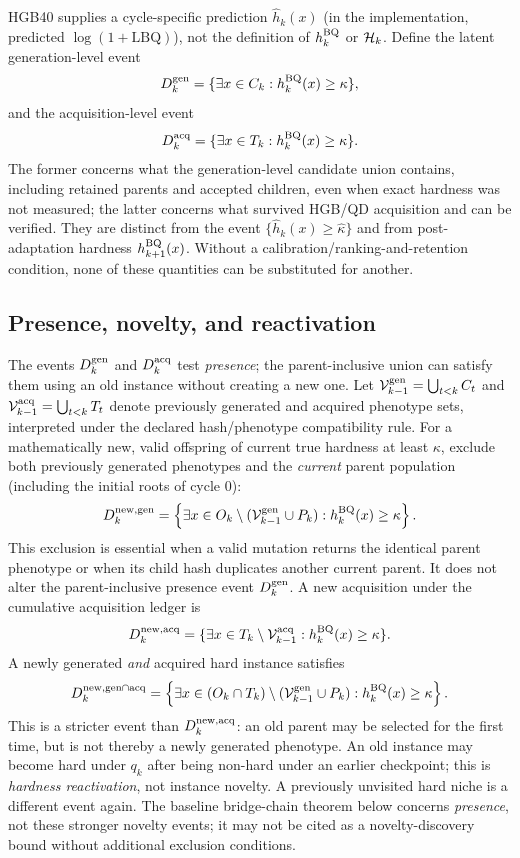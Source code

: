 HGB40 supplies a cycle-specific prediction $\widehat h_k(x)$ (in the
implementation, predicted $\log(1+\mathrm{LBQ})$), not the definition of
$h_k^{\rm BQ}$ or $\mathcal{H}_k$. Define the latent generation-level event
\[
 D_k^{\rm gen}=\{\exists x\in C_k: h_k^{\rm BQ}(x)\geq\kappa\},
\]
and the acquisition-level event
\[
 D_k^{\rm acq}=\{\exists x\in T_k: h_k^{\rm BQ}(x)\geq\kappa\}.
\]
The former concerns what the generation-level candidate union contains,
including retained parents and accepted children, even when exact hardness
was not measured; the latter concerns what survived HGB/QD acquisition and can be
verified. They are distinct from the event
$\{\widehat h_k(x)\geq\widehat\kappa\}$ and from post-adaptation hardness
$h_{k+1}^{\rm BQ}(x)$. Without a calibration/ranking-and-retention condition,
none of these quantities can be substituted for another.

\subsection{Presence, novelty, and reactivation}
The events $D_k^{\rm gen}$ and $D_k^{\rm acq}$ test \emph{presence}; the
parent-inclusive union can satisfy them using an old instance without
creating a new one. Let $\mathcal V_{k-1}^{\rm gen}
=\bigcup_{t<k}C_t$ and $\mathcal V_{k-1}^{\rm acq}
=\bigcup_{t<k}T_t$ denote previously generated and acquired phenotype sets,
interpreted under the declared hash/phenotype compatibility rule.
For a mathematically new, valid offspring of current true hardness at least
$\kappa$, exclude both previously generated phenotypes and the \emph{current}
parent population (including the initial roots of cycle 0):
\[
 D_k^{\rm new,gen}
 =\left\{\exists x\in
 O_k\setminus(\mathcal V_{k-1}^{\rm gen}\cup P_k):
 h_k^{\rm BQ}(x)\geq\kappa\right\}.
\]
This exclusion is essential when a valid mutation returns the identical
parent phenotype or when its child hash duplicates another current parent.
It does not alter the parent-inclusive presence event $D_k^{\rm gen}$.
A new acquisition under the cumulative acquisition ledger is
\[
 D_k^{\rm new,acq}
 =\{\exists x\in T_k\setminus\mathcal V_{k-1}^{\rm acq}:
               h_k^{\rm BQ}(x)\geq\kappa\}.
\]
A newly generated \emph{and} acquired hard instance satisfies
\[
 D_k^{\rm new,gen\cap acq}=
 \left\{\exists x\in
 (O_k\cap T_k)\setminus
 (\mathcal V_{k-1}^{\rm gen}\cup P_k):
 h_k^{\rm BQ}(x)\geq\kappa\right\}.
\]
This is a stricter event than $D_k^{\rm new,acq}$: an old parent may be
selected for the first time, but is not thereby a newly generated phenotype.
An old instance may become hard under $q_k$ after being non-hard under an
earlier checkpoint; this is \emph{hardness reactivation}, not instance
novelty. A previously unvisited hard niche is a different event again.
The baseline bridge-chain theorem below concerns \emph{presence}, not these
stronger novelty events; it may not be cited as a novelty-discovery bound
without additional exclusion conditions.

